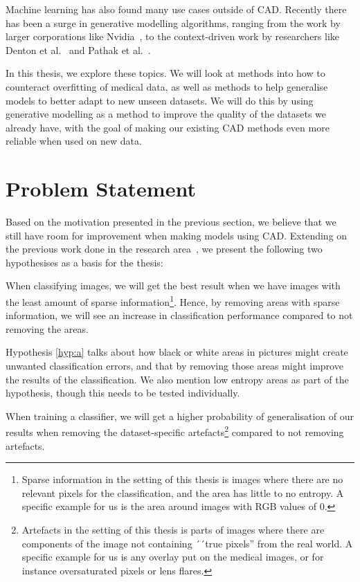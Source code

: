 Machine learning has also found many use cases outside of CAD. Recently there has been a surge in generative modelling algorithms, ranging from the work by larger corporations like Nvidia~\cite{DBLP:journals/corr/abs-1812-04948}, to the context-driven work by researchers like Denton et al.~\cite{DBLP:journals/corr/DentonGF16} and Pathak et al.~\cite{DBLP:journals/corr/PathakKDDE16}.


In this thesis, we explore these topics. We will look at methods into how to counteract overfitting of medical data, as well as methods to help generalise models to better adapt to new unseen datasets. We will do this by using generative modelling as a method to improve the quality of the datasets we already have, with the goal of making our existing CAD methods even more reliable when used on new data.


\section{Problem Statement}
\label{cha:problemstatement}
Based on the motivation presented in the previous section, we believe that we still have room for improvement when making models using CAD. Extending on the previous work done in the research area~\cite{25956,25953,riegler2016eir}, we present the following two hypothesises as a basis for the thesis:

\noindent
\begin{hyp} \label{hyp:a}
When classifying images, we will get the best result when we have images with the least amount of sparse information\footnote{Sparse information in the setting of this thesis is images where there are no relevant pixels for the classification, and the area has little to no entropy. A specific example for us is the area around images with RGB values of 0.}. 
Hence, by removing areas with sparse information,
we will see an increase in classification performance compared to not removing the areas.
\end{hyp}

\noindent
Hypothesis \ref{hyp:a} talks about how black or white areas in pictures might create unwanted classification errors, and that by removing those areas might improve the results of the classification. We also mention low entropy areas as part of the hypothesis, though this needs to be tested individually.


\noindent 
\begin{hyp} \label{hyp:b}
When training a classifier, we will get a higher probability of generalisation of our results when removing the dataset-specific artefacts\footnote{Artefacts in the setting of this thesis is parts of images where there are components of the image not containing ´´true pixels'' from the real world. A specific example for us is any overlay put on the medical images, or for instance oversaturated pixels or lens flares.} compared to not removing artefacts.
\end{hyp}

